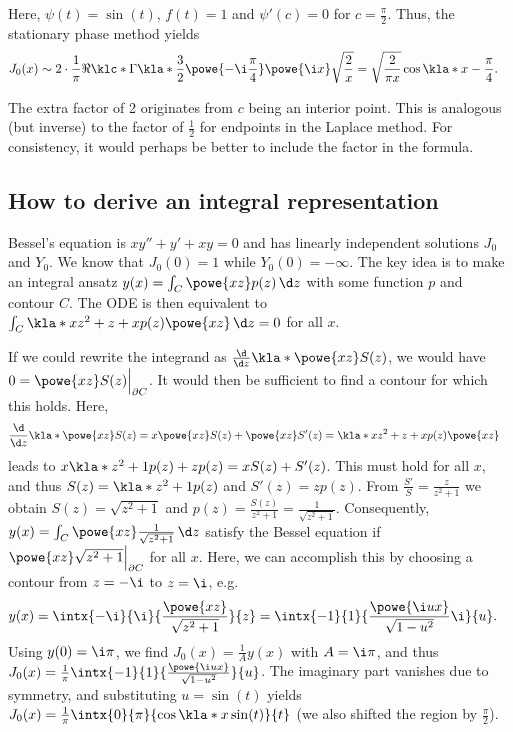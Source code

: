 \documentclass[english, parskip=full]{scrbook}
\newcommand{\note}[1]{\begin{tcolorbox}[colback=colorbackgroundnote,colframe=colornote, breakable,enhanced]#1\end{tcolorbox}}
\newcommand{\example}[3]{\begin{tcolorbox}[colback=colorbackgroundexample,colframe=colorexample, breakable,enhanced,title={\textbf{#1}: #2.}]#3\end{tcolorbox}}
\begin{document}
\example{Bessel function}{$J_0(x) = \frac{1}{\pi} \intx{0}{\pi}{\cos\kla*{x\sin(t)}}{t}$ as $x\rightarrow\infty$}{Here, $\psi(t)=\sin(t)$, $f(t)=1$ and $\psi'(c)=0$ for $c=\frac{\pi}{2}$.
Thus, the stationary phase method yields
\begin{align}
J_0(x) &\sim 2\cdot \frac{1}{\pi} \Re \klc*{\Gamma\kla*{\frac{3}{2}} \powe{-\i \frac{\pi}{4}} \powe{\i x} \sqrt{\frac{2}{x}}} = \sqrt{\frac{2}{\pi x}} \cos\kla*{x - \frac{\pi}{4}}.
\end{align}
\note{The extra factor of 2 originates from $c$ being an interior point.
This is analogous (but inverse) to the factor of $\frac{1}{2}$ for endpoints in the Laplace method.
For consistency, it would perhaps be better to include the factor in the formula.}
}
\subsection{How to derive an integral representation}
Bessel's equation is $xy''+y'+xy = 0$ and has linearly independent solutions $J_0$ and $Y_0$.
We know that $J_0(0)=1$ while $Y_0(0)=-\infty$.
The key idea is to make an integral ansatz $y(x) = \int_C \powe{xz}p(z)\,\d z$ with some function $p$ and contour $C$.
The ODE is then equivalent to $\int_C \kla*{xz^2+z+x}p(z) \powe{xz}\,\d z = 0$ for all $x$.

If we could rewrite the integrand as $\frac{\d}{\d z} \kla*{\powe{x z} S(z)}$, we would have $0 = \powe{xz} S(z)\Big\vert_{\partial C}$.
It would then be sufficient to find a contour for which this holds.
Here,
\begin{align}
\frac{\d}{\d z} \kla*{\powe{xz} S(z)} &= x\powe{xz}S(z) + \powe{xz} S'(z) = \kla*{xz^2+z+x}p(z) \powe{xz}
\end{align}
leads to $x\kla*{z^2+1}p(z) + zp(z) = xS(z) + S'(z)$.
This must hold for all $x$, and thus $S(z)=\kla*{z^2+1}p(z)$ and $S'(z) = zp(z)$.
From $\frac{S'}{S} = \frac{z}{z^2+1}$ we obtain $S(z)=\sqrt{z^2+1}$ and $p(z) = \frac{S(z)}{z^2+1} = \frac{1}{\sqrt{z^2+1}}$.
Consequently, $y(x) = \int_C \powe{xz} \frac{1}{\sqrt{z^2+1}} \,\d z$ satisfy the Bessel equation if $\powe{xz}\sqrt{z^2+1}\Big\vert_{\partial C}$ for all $x$.
Here, we can accomplish this by choosing a contour from $z=-\i$ to $z=\i$, e.g.
\begin{align}
y(x) &= \intx{-\i}{\i}{\frac{\powe{xz}}{\sqrt{z^2+1}}}{z} = \intx{-1}{1}{\frac{\powe{\i ux}}{\sqrt{1-u^2}}\i}{u}.
\end{align}
Using $y(0)=\i\pi$, we find $J_0(x) = \frac{1}{A}y(x)$ with $A=\i\pi$, and thus $J_0(x) = \frac{1}{\pi} \intx{-1}{1}{\frac{\powe{\i ux}}{\sqrt{1-u^2}}}{u}$.
The imaginary part vanishes due to symmetry, and substituting $u=\sin(t)$ yields $J_0(x) = \frac{1}{\pi} \intx{0}{\pi}{\cos\kla*{x\sin(t)}}{t}$ (we also shifted the region by $\frac{\pi}{2}$).
\end{document}
